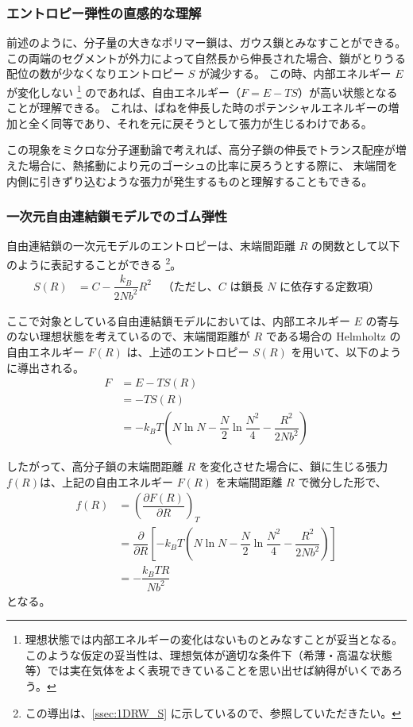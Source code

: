 \documentclass[a4paper,11pt]{ltjsarticle}
\begin{document}
\subsubsection{エントロピー弾性の直感的な理解}

前述のように、分子量の大きなポリマー鎖は、ガウス鎖とみなすことができる。
この両端のセグメントが外力によって自然長から伸長された場合、鎖がとりうる配位の数が少なくなりエントロピー $S$ が減少する。
この時、内部エネルギー $E$ が変化しない
\footnote
{
理想状態では内部エネルギーの変化はないものとみなすことが妥当となる。
このような仮定の妥当性は、理想気体が適切な条件下（希薄・高温な状態等）では実在気体をよく表現できていることを思い出せば納得がいくであろう。
}
のであれば、自由エネルギー（$F=E-TS$）が高い状態となることが理解できる。
これは、ばねを伸長した時のポテンシャルエネルギーの増加と全く同等であり、それを元に戻そうとして張力が生じるわけである。

この現象をミクロな分子運動論で考えれば、高分子鎖の伸長でトランス配座が増えた場合に、熱搖動により元のゴーシュの比率に戻ろうとする際に、
末端間を内側に引きずり込むような張力が発生するものと理解することもできる。

\subsubsection{一次元自由連結鎖モデルでのゴム弾性}

自由連結鎖の一次元モデルのエントロピーは、末端間距離 $R$ の関数として以下のように表記することができる
\footnote
{
この導出は、\ref{ssec:1DRW_S} に示しているので、参照していただきたい。
}。
\begin{align*}
S(R)
	&= C -\dfrac{ k_B}{2Nb^2}R^2 \quad \text{（ただし、$C$ は鎖長 $N$ に依存する定数項）}
\end{align*}


ここで対象としている自由連結鎖モデルにおいては、内部エネルギー $E$ の寄与のない理想状態を考えているので、末端間距離が $R$ である場合の Helmholtz の自由エネルギー $F(R)$ は、上述のエントロピー $S(R)$ を用いて、以下のように導出される。
\begin{align*}
F 	&= E - TS(R) \\
	&= -TS(R) \\
	&= -k_B T \left( N\ln N - \dfrac{N}{2} \ln \dfrac{N^2}{4} - \dfrac{R^2}{2Nb^2} \right) 
\end{align*}

したがって、高分子鎖の末端間距離 $R$ を変化させた場合に、鎖に生じる張力 $f(R)$は、上記の自由エネルギー $F(R)$ を末端間距離 $R$ で微分した形で、
\begin{align*}
f(R) 	
&= \left(\dfrac{\partial F(R)}{\partial R} \right)_T \\
	&=\dfrac{\partial}{\partial R} \left[ -k_B T \left( N\ln N - \dfrac{N}{2} \ln \dfrac{N^2}{4} - \dfrac{R^2}{2Nb^2} \right) \right]\\
	&=- \dfrac{k_B T R}{Nb^2}
\end{align*}
となる。
\end{document}

